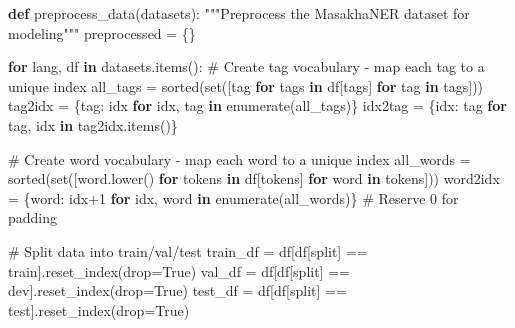 \documentclass[
]{article}
\newenvironment{Shaded}{\begin{snugshade}}{\end{snugshade}}
\newcommand{\BuiltInTok}[1]{\textcolor[rgb]{0.00,0.23,0.31}{#1}}
\newcommand{\CommentTok}[1]{\textcolor[rgb]{0.37,0.37,0.37}{#1}}
\newcommand{\ControlFlowTok}[1]{\textcolor[rgb]{0.00,0.23,0.31}{\textbf{#1}}}
\newcommand{\DecValTok}[1]{\textcolor[rgb]{0.68,0.00,0.00}{#1}}
\newcommand{\KeywordTok}[1]{\textcolor[rgb]{0.00,0.23,0.31}{\textbf{#1}}}
\newcommand{\NormalTok}[1]{\textcolor[rgb]{0.00,0.23,0.31}{#1}}
\newcommand{\OperatorTok}[1]{\textcolor[rgb]{0.37,0.37,0.37}{#1}}
\newcommand{\StringTok}[1]{\textcolor[rgb]{0.13,0.47,0.30}{#1}}
\newcommand{\VariableTok}[1]{\textcolor[rgb]{0.07,0.07,0.07}{#1}}
\begin{document}
\begin{Shaded}
\begin{Highlighting}[]
\KeywordTok{def}\NormalTok{ preprocess\_data(datasets):}
    \CommentTok{"""Preprocess the MasakhaNER dataset for modeling"""}
\NormalTok{    preprocessed }\OperatorTok{=}\NormalTok{ \{\}}
    
    \ControlFlowTok{for}\NormalTok{ lang, df }\KeywordTok{in}\NormalTok{ datasets.items():}
        \CommentTok{\# Create tag vocabulary {-} map each tag to a unique index}
\NormalTok{        all\_tags }\OperatorTok{=} \BuiltInTok{sorted}\NormalTok{(}\BuiltInTok{set}\NormalTok{([tag }\ControlFlowTok{for}\NormalTok{ tags }\KeywordTok{in}\NormalTok{ df[}\StringTok{\textquotesingle{}tags\textquotesingle{}}\NormalTok{] }\ControlFlowTok{for}\NormalTok{ tag }\KeywordTok{in}\NormalTok{ tags]))}
\NormalTok{        tag2idx }\OperatorTok{=}\NormalTok{ \{tag: idx }\ControlFlowTok{for}\NormalTok{ idx, tag }\KeywordTok{in} \BuiltInTok{enumerate}\NormalTok{(all\_tags)\}}
\NormalTok{        idx2tag }\OperatorTok{=}\NormalTok{ \{idx: tag }\ControlFlowTok{for}\NormalTok{ tag, idx }\KeywordTok{in}\NormalTok{ tag2idx.items()\}}
        
        \CommentTok{\# Create word vocabulary {-} map each word to a unique index}
\NormalTok{        all\_words }\OperatorTok{=} \BuiltInTok{sorted}\NormalTok{(}\BuiltInTok{set}\NormalTok{([word.lower() }\ControlFlowTok{for}\NormalTok{ tokens }\KeywordTok{in}\NormalTok{ df[}\StringTok{\textquotesingle{}tokens\textquotesingle{}}\NormalTok{] }\ControlFlowTok{for}\NormalTok{ word }\KeywordTok{in}\NormalTok{ tokens]))}
\NormalTok{        word2idx }\OperatorTok{=}\NormalTok{ \{word: idx}\OperatorTok{+}\DecValTok{1} \ControlFlowTok{for}\NormalTok{ idx, word }\KeywordTok{in} \BuiltInTok{enumerate}\NormalTok{(all\_words)\}  }\CommentTok{\# Reserve 0 for padding}
        
        \CommentTok{\# Split data into train/val/test}
\NormalTok{        train\_df }\OperatorTok{=}\NormalTok{ df[df[}\StringTok{\textquotesingle{}split\textquotesingle{}}\NormalTok{] }\OperatorTok{==} \StringTok{\textquotesingle{}train\textquotesingle{}}\NormalTok{].reset\_index(drop}\OperatorTok{=}\VariableTok{True}\NormalTok{)}
\NormalTok{        val\_df }\OperatorTok{=}\NormalTok{ df[df[}\StringTok{\textquotesingle{}split\textquotesingle{}}\NormalTok{] }\OperatorTok{==} \StringTok{\textquotesingle{}dev\textquotesingle{}}\NormalTok{].reset\_index(drop}\OperatorTok{=}\VariableTok{True}\NormalTok{)}
\NormalTok{        test\_df }\OperatorTok{=}\NormalTok{ df[df[}\StringTok{\textquotesingle{}split\textquotesingle{}}\NormalTok{] }\OperatorTok{==} \StringTok{\textquotesingle{}test\textquotesingle{}}\NormalTok{].reset\_index(drop}\OperatorTok{=}\VariableTok{True}\NormalTok{)}
        

\end{Highlighting}
\end{Shaded}
\end{document}

